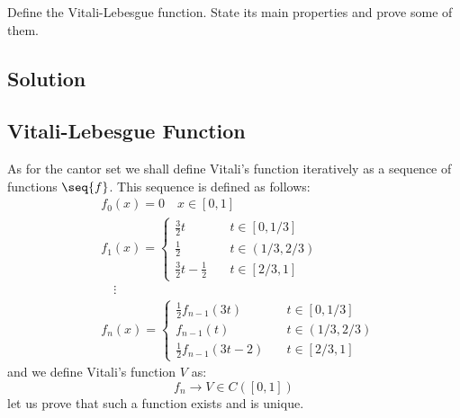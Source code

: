 

\question

Define the Vitali-Lebesgue function. State its main properties and prove some of 
them.

\subsection*{Solution}

\subsection{Vitali-Lebesgue Function}
As for the cantor set we shall define Vitali's function iteratively as a sequence of functions $\seq{f}$. This sequence is defined as follows:
\begin{align*}
    & f_0(x) = 0 \quad x\in [0,1] \\
    & f_1(x) = \begin{cases}
        \frac{3}{2}t \quad & t\in [0,1/3] \\
        \frac{1}{2} \quad & t\in (1/3,2/3) \\
        \frac{3}{2}t - \frac{1}{2} \quad & t\in [2/3,1]
    \end{cases} \\
    & \quad \vdots \\
    & f_{n}(x) = \begin{cases}
        \frac{1}{2}f_{n-1}(3t) \quad & t\in [0,1/3] \\
        f_{n-1}(t) \quad & t\in (1/3,2/3) \\
        \frac{1}{2}f_{n-1}(3t - 2) \quad & t\in [2/3,1]
    \end{cases}
\end{align*}
and we define Vitali's function $V$ as:
\[
    f_n \to V \in C([0,1])    
\]
let us prove that such a function exists and is unique.

